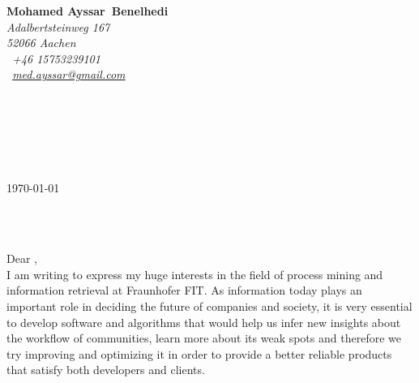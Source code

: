 

\pagestyle{empty}


\setlength{\parindent}{0pt}
\addtolength{\parskip}{6pt}

\def\firstname{Mohamed Ayssar}
\def\familyname{Benelhedi}
\def\FileAuthor{\firstname~\familyname}
\def\FileTitle{\firstname~\familyname's Bewerbungsschreiben}
\def\FileSubject{Bewerbungsschreiben}
\def\FileKeyWords{\firstname~\familyname, Bewerbungsschreiben}

\renewcommand{\ttdefault}{pcr}



\hypersetup{pdfborder=0 0 0}


\sffamily   %
\hfill%
\begin{minipage}[t]{.6\textwidth}
	\raggedleft%
	{\bfseries {\color{firstnamecolor}\firstname}~{\color{familynamecolor}\familyname}}\\[.35ex]
	\small\itshape%
	Adalbertsteinweg 167\\
	52066 Aachen\\[.35ex]
	\Mobilefone~+46 15753239101\\
	\Letter~\href{mailto:med.ayssar@gmail.com}{med.ayssar@gmail.com}
\end{minipage}\\[0.5em]
%
%
\begin{minipage}[t]{.4\textwidth}
	\raggedright%
	\vspace*{1em}
	\firmaContact\\[.20ex]
	\firmaName\\[.35ex]
	\small%
	\firmaStreet\\
	\firmaPlzCode
\end{minipage}
%
\hfill
%
\begin{minipage}[t]{.4\textwidth}
	\raggedleft %
	\today
\end{minipage}\\[1em]
\raggedright

{\bfseries \color{familynamecolor}\jobName}\\[1.5em]

Dear \contact, \\[1em]
%
I am writing to express my huge interests in the field of process mining and information retrieval at Fraunhofer FIT. As information today plays an important role in deciding the future of companies and society, it is very essential to develop software and algorithms that would help us infer new insights about the workflow of communities, learn more about its weak spots and therefore we try improving and optimizing it in order to provide a better reliable products that satisfy both developers and clients.

